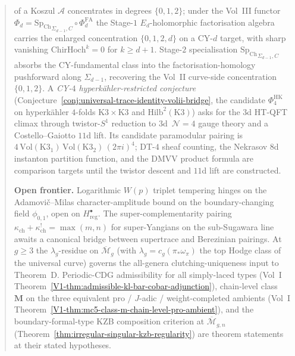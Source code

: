 \documentclass[11pt]{memoir}
\providecommand{\PhiFA}{\Phi^{\mathrm{FA}}}
\providecommand{\SpCh}{\mathrm{Sp}_{\mathrm{Ch}}}
\newcommand{\cA}{\mathcal{A}}
\providecommand{\cN}{\mathcal{N}}
\providecommand{\cM}{\mathcal{M}}
\providecommand{\cM}{\mathcal{M}}
\providecommand{\PhiFA}{\Phi^{\mathrm{FA}}}
\providecommand{\SpCh}{\mathrm{Sp}^{\mathrm{ch}}}
\begin{document}
\begin{abstract}
of a Koszul $\cA$ concentrates in degrees $\{0, 1, 2\}$; under
the Vol~III functor $\Phi_d = {\SpCh}_{\Sigma_{d-1},C}\circ\PhiFA_d$
the Stage-$1$ $E_d$-holomorphic factorisation algebra carries the
enlarged concentration $\{0, 1, 2, d\}$ on a CY-$d$ target, with
sharp vanishing $\mathrm{ChirHoch}^k = 0$ for $k \ge d + 1$.
Stage-$2$ specialisation ${\SpCh}_{\Sigma_{d-1},C}$ absorbs the
CY-fundamental class into the factorisation-homology pushforward
along $\Sigma_{d-1}$, recovering the Vol~II curve-side
concentration $\{0,1,2\}$. A \emph{CY-$4$ hyperk\"ahler-restricted conjecture}
(Conjecture~\ref{conj:universal-trace-identity-volii-bridge},
the candidate $\Phi_4^{\mathrm{HK}}$ on hyperk\"ahler $4$-folds
$\mathrm{K3} \times \mathrm{K3}$ and $\mathrm{Hilb}^2(\mathrm{K3})$)
asks for the $3$d HT-QFT climax through twistor-$S^1$ reduction to
$3$d~$\cN=4$ gauge theory and a Costello--Gaiotto $11$d lift.  Its
candidate paramodular pairing is
$4\,\mathrm{Vol}(\mathrm{K3}_1)\,\mathrm{Vol}(\mathrm{K3}_2)\,(2\pi i)^4$;
DT-$4$ sheaf counting, the Nekrasov $8$d instanton partition function,
and the DMVV product formula are comparison targets until the twistor
descent and $11$d lift are constructed.

\textbf{Open frontier.}
Logarithmic $W(p)$ triplet tempering hinges on the
Adamovi\v{c}--Milas character-amplitude bound on the
boundary-changing field $\phi_{0,1}$, open on
$H^\bullet_{\mathrm{reg}}$.
The super-complementarity pairing
$\kappa_{\mathrm{ch}} + \kappa_{\mathrm{ch}}^! = \max(m,n)$
for super-Yangians on the sub-Sugawara line awaits a canonical
bridge between supertrace and Berezinian pairings.
At $g \ge 3$ the $\lambda_g$-residue on $\overline{\cM}_g$
(with $\lambda_g = c_g(\pi_*\omega_\pi)$ the top Hodge class
of the universal curve) governs the all-genera
clutching-uniqueness input to Theorem~D.
Periodic-CDG admissibility for all simply-laced types
(Vol~I Theorem~\ref{V1-thm:admissible-kl-bar-cobar-adjunction}),
chain-level class~$\mathbf{M}$ on the three equivalent pro /
$J$-adic / weight-completed ambients
(Vol~I Theorem~\ref{V1-thm:mc5-class-m-chain-level-pro-ambient}),
and the boundary-formal-type KZB composition criterion at
$\overline{\cM}_{g,n}$
(Theorem~\ref{thm:irregular-singular-kzb-regularity}) are theorem
statements at their stated hypotheses.

\smallskip


\end{abstract}
\end{document}
